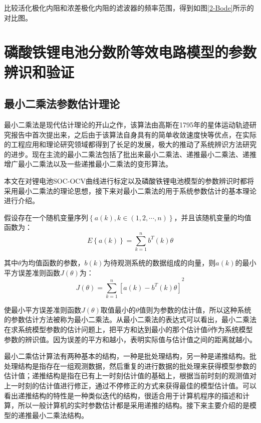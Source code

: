 比较活化极化内阻和浓差极化内阻的滤波器的频率范围，得到如图\ref{2-Bode}所示的对比图。

\section{磷酸铁锂电池分数阶等效电路模型的参数辨识和验证}
\subsection{最小二乘法参数估计理论}
最小二乘法是现代估计理论的开山之作，该算法由高斯在1795年的星体运动轨迹研究报告中首次提出来，之后由于该算法自身具有的简单收敛速度快等优点，在实际的工程应用和理论研究领域都得到了长足的发展，极大的推动了系统辨识方法研究的进步。现在主流的最小二乘法包括了批出来最小二乘法、递推最小二乘法、递推增广最小二乘法以及一些递推最小二乘法的变形算法。

本文在对锂电池SOC-OCV曲线进行标定以及磷酸铁锂电池模型的参数辨识时都将采用最小二乘法的理论思想，接下来对最小二乘法的用于系统参数估计的基本理论进行介绍。

假设存在一个随机变量序列$\left\{ a\left( k \right),k\in \left( 1,2,\cdots ,n \right) \right\}$，并且该随机变量的均值函数为：
\begin{equation}
E\left\{ a\left( k \right) \right\}=\sum\limits_{k=1}^{n}{{{b}^{T}}\left( k \right)\theta }
\end{equation}

其中$\theta $为均值函数的参数，$b\left( k \right)$为待观测系统的数据组成的向量，则$a\left( k \right)$的最小平方误差准则函数$J\left( \theta  \right)$为：
\begin{equation}
J\left( \theta  \right)={{\sum\limits_{k=1}^{n}{\left[ a(k)-{{b}^{T}}(k)\theta  \right]}}^{2}}
\end{equation}

使最小平方误差准则函数$J\left( \theta  \right)$取值最小的$\theta$值则为参数的估计值，所以这种系统的参数估计方法被称为最小二乘法。从最小二乘法的表达式可以看出，最小二乘法在求系统模型参数的估计问题上，把平方和达到最小的那个估计值$\hat{\theta }$作为系统模型参数的辨识值。因为误差的平方和越小，表明实际值与估计值之间的距离就越小。

最小二乘估计算法有两种基本的结构，一种是批处理结构，另一种是递推结构。批处理结构是指存在一组观测数据，然后重复的进行数据的批处理来获得模型参数的估计值；递推结构是指在已有上一时刻估计值的基础上，根据当前时刻的观测值对上一时刻的估计值进行修正，通过不停修正的方式来获得最佳的模型估计值。可以看出递推结构的特性是一种类似迭代的结构，很适合用于计算机程序的描述和计算，所以一般计算机的实时参数估计都是采用递推的结构。接下来主要介绍的是模型的递推最小二乘法结构。

